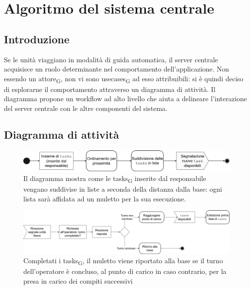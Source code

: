 \section{Algoritmo del sistema centrale}
\subsection{Introduzione}
Se le unità viaggiano in modalità di guida automatica, il server centrale acquisisce un ruolo determinante nel comportamento dell'applicazione. Non essendo un \gls{attore}\textsubscript{G}, non vi sono \glspl{usecase}\textsubscript{G} ad esso attribuibili: si è quindi deciso di esplorarne il comportamento attraverso un diagramma di attività. Il diagramma propone un workflow ad alto livello che aiuta a delineare l'interazione del server centrale con le altre componenti del sistema.



\subsection{Diagramma di attività}

\begin{figure}[H]
	\centering
	\includegraphics[scale=0.35]{res/images/diagramma_di_attivita3.png}
	\caption[Diagramma di attività per l'ordinamento  delle tasks]{Il diagramma mostra come le \glspl{task}\textsubscript{G} inserite dal responsabile vengano suddivise in liste a seconda della distanza dalla base: ogni lista sarà affidata ad un muletto per la sua esecuzione.}
\end{figure}

\begin{figure}[H]
	\centering
	\includegraphics[scale=0.35]{res/images/diagramma_di_attivita1.png}
	\caption[Diagramma di attività per la gestione del muletto dopo il completamento della lista di tasks]{Completati i \glspl{task}\textsubscript{G}, il muletto viene riportato alla base se il turno dell'operatore è concluso, al punto di carico in caso contrario, per la presa in carico dei compiti successivi}
\end{figure}



